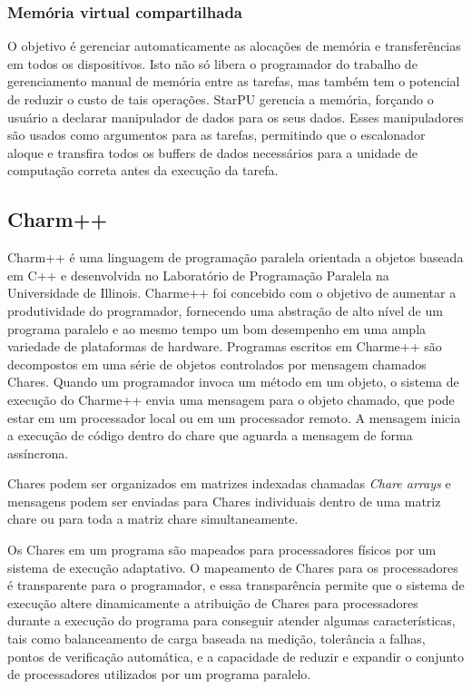 \subsubsection{Memória virtual compartilhada}

O objetivo é gerenciar automaticamente as alocações de memória e transferências em todos os dispositivos. Isto não só libera o programador do trabalho de gerenciamento manual de memória entre as tarefas, mas também tem o potencial de reduzir o custo de tais operações. StarPU gerencia a memória, forçando o usuário a declarar manipulador de dados para os seus dados. Esses manipuladores são usados como argumentos para as tarefas, permitindo que o escalonador aloque e transfira todos os buffers de dados necessários para a unidade de computação correta antes da execução da tarefa.


\subsection{Charm++}

Charm++ é uma linguagem de programação paralela orientada a objetos baseada em C++ e desenvolvida no Laboratório de Programação Paralela na Universidade de Illinois. Charme++ foi concebido com o objetivo de aumentar a produtividade do programador, fornecendo uma abstração de alto nível de um programa paralelo e ao mesmo tempo um bom desempenho em uma ampla variedade de plataformas de hardware. Programas escritos em Charme++ são decompostos em uma série de objetos controlados por mensagem chamados Chares. Quando um programador invoca um método em um objeto, o sistema de execução do Charme++ envia uma mensagem para o objeto chamado, que pode estar em um processador local ou em um processador remoto. A mensagem inicia a execução de código dentro do chare que aguarda a  mensagem de forma assíncrona. 

Chares podem ser organizados em matrizes indexadas chamadas \emph{Chare arrays} e mensagens podem ser enviadas para Chares individuais dentro de uma matriz chare ou para toda a matriz chare simultaneamente. 

Os Chares em um programa são mapeados para processadores físicos por um sistema de execução adaptativo. O mapeamento de Chares para os processadores é transparente para o programador, e essa transparência permite que o sistema de execução altere dinamicamente a atribuição de Chares para processadores durante a execução do programa para conseguir atender algumas características, tais como balanceamento de carga baseada na medição, tolerância a falhas, pontos de verificação automática, e a capacidade de reduzir e expandir o conjunto de processadores utilizados por um programa paralelo.

